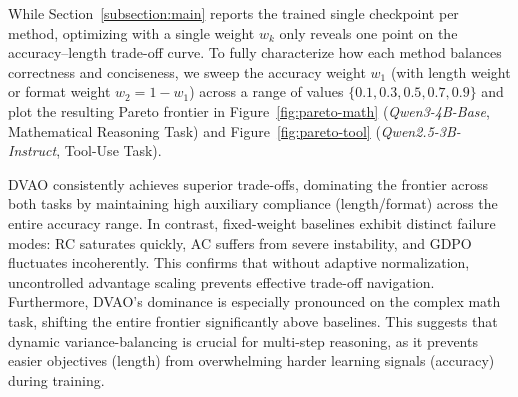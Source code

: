 While Section~\ref{subsection:main} reports the trained single checkpoint per method, optimizing with a single weight $w_k$ only reveals one point on the accuracy--length trade-off curve. To fully characterize how each method balances correctness and conciseness, we sweep the accuracy weight $w_1$ (with length weight or format weight $w_2 = 1 - w_1$) across a range of values $\{0.1, 0.3, 0.5, 0.7, 0.9\}$ and plot the resulting Pareto frontier in Figure~\ref{fig:pareto-math} (\textit{Qwen3-4B-Base}, Mathematical Reasoning Task) and Figure~\ref{fig:pareto-tool} (\textit{Qwen2.5-3B-Instruct}, Tool-Use Task).

DVAO consistently achieves superior trade-offs, dominating the frontier across both tasks by maintaining high auxiliary compliance (length/format) across the entire accuracy range. In contrast, fixed-weight baselines exhibit distinct failure modes: RC saturates quickly, AC suffers from severe instability, and GDPO fluctuates incoherently. This confirms that without adaptive normalization, uncontrolled advantage scaling prevents effective trade-off navigation. Furthermore, DVAO's dominance is especially pronounced on the complex math task, shifting the entire frontier significantly above baselines. This suggests that dynamic variance-balancing is crucial for multi-step reasoning, as it prevents easier objectives (length) from overwhelming harder learning signals (accuracy) during training.



